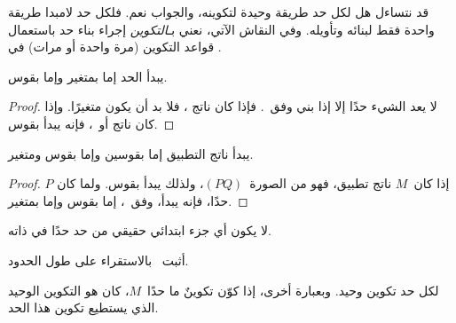 \documentclass[../../../include/open-logic-section]{subfiles}
\begin{document}

قد نتساءل هل لكل حد طريقة وحيدة لتكوينه، والجواب نعم. فلكل حد لامبدا
طريقة واحدة فقط لبنائه وتأويله. وفي النقاش الآتي، نعني بـ\emph{التكوين}
إجراء بناء حد باستعمال قواعد التكوين (مرة واحدة أو مرات) في
.

\begin{lem}
يبدأ الحد إما بمتغير وإما بقوس.
\end{lem}

\begin{proof}
لا يعد الشيء حدًا إلا إذا بني وفق~. فإذا كان ناتج
، فلا بد أن يكون متغيرًا. وإذا كان ناتج
 أو~، فإنه يبدأ بقوس.
\end{proof}

\begin{lem}
يبدأ ناتج التطبيق إما بقوسين وإما بقوس ومتغير.
\end{lem}

\begin{proof}
إذا كان~$M$ ناتج تطبيق، فهو من الصورة~$(PQ)$، ولذلك يبدأ بقوس. ولما كان
$P$ حدًا، فإنه يبدأ، وفق~، إما بقوس وإما بمتغير.
\end{proof}

\begin{lem}
لا يكون أي جزء ابتدائي حقيقي من حد حدًا في ذاته.
\end{lem}

\begin{prob}
أثبت~ بالاستقراء على طول الحدود.
\end{prob}

\begin{prop} 
لكل حد تكوين وحيد. وبعبارة أخرى، إذا كوّن تكوينٌ ما حدًا~$M$، كان هو
التكوين الوحيد الذي يستطيع تكوين هذا الحد.
\end{prop}
\end{document}
